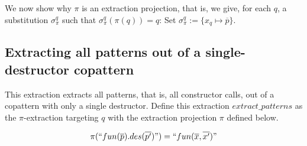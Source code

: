 We now show why $\pi$ is an extraction projection, that is, we give, for each $q$, a substitution $\sigma^q_\pi$ such that $\sigma^q_\pi(\pi(q)) = q$: Set $\sigma^q_\pi := \{x_q \mapsto \overline{p}\}$.

\subsection{Extracting all patterns out of a single-destructor copattern}

This extraction extracts all patterns, that is, all constructor calls, out of a copattern with only a single destructor. Define this extraction $extract\_patterns$ as the $\pi$-extraction targeting $q$ with the extraction projection $\pi$ defined below.

\[
\pi(`` fun(\overline{p}).des(\overline{p'}) ") = `` fun(\overline{x}, \overline{x'}) "
\]